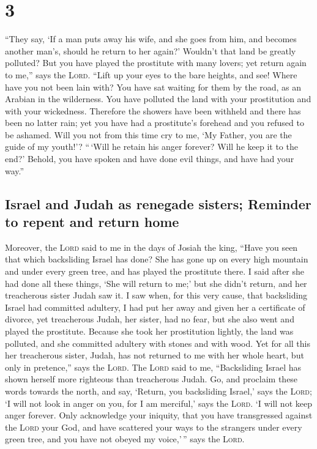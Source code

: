 \hypertarget{section-2}{%
\section{3}\label{section-2}}

 ``They say, `If a man puts away his wife, and she goes
from him, and becomes another man's, should he return to her again?'
Wouldn't that land be greatly polluted? But you have played the
prostitute with many lovers; yet return again to me,'' says the
\textsc{Lord}.  ``Lift up your eyes to the bare heights,
and see! Where have you not been lain with? You have sat waiting for
them by the road, as an Arabian in the wilderness. You have polluted the
land with your prostitution and with your wickedness. 
Therefore the showers have been withheld and there has been no latter
rain; yet you have had a prostitute's forehead and you refused to be
ashamed.  Will you not from this time cry to me, `My
Father, you are the guide of my youth!'?  ``\,`Will he
retain his anger forever? Will he keep it to the end?' Behold, you have
spoken and have done evil things, and have had your way.''

\hypertarget{israel-and-judah-as-renegade-sisters-reminder-to-repent-and-return-home}{%
\subsection{Israel and Judah as renegade sisters; Reminder to repent and
return
home}\label{israel-and-judah-as-renegade-sisters-reminder-to-repent-and-return-home}}

 Moreover, the \textsc{Lord} said to me in the days of
Josiah the king, ``Have you seen that which backsliding Israel has done?
She has gone up on every high mountain and under every green tree, and
has played the prostitute there.  I said after she had
done all these things, `She will return to me;' but she didn't return,
and her treacherous sister Judah saw it.  I saw when, for
this very cause, that backsliding Israel had committed adultery, I had
put her away and given her a certificate of divorce, yet treacherous
Judah, her sister, had no fear, but she also went and played the
prostitute.  Because she took her prostitution lightly,
the land was polluted, and she committed adultery with stones and with
wood.  Yet for all this her treacherous sister, Judah,
has not returned to me with her whole heart, but only in pretence,''
says the \textsc{Lord}.  The \textsc{Lord} said to me,
``Backsliding Israel has shown herself more righteous than treacherous
Judah.  Go, and proclaim these words towards the north,
and say, `Return, you backsliding Israel,' says the \textsc{Lord}; `I
will not look in anger on you, for I am merciful,' says the
\textsc{Lord}. `I will not keep anger forever.  Only
acknowledge your iniquity, that you have transgressed against the
\textsc{Lord} your God, and have scattered your ways to the strangers
under every green tree, and you have not obeyed my voice,'\,'' says the
\textsc{Lord}.

